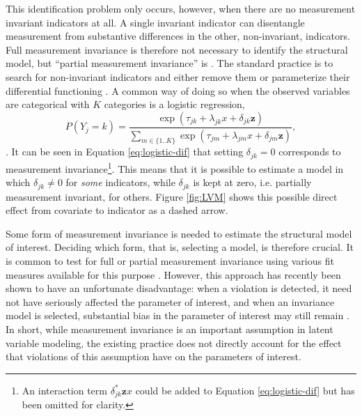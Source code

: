 \documentclass[letterpaper,12pt]{article}
\begin{document}
This identification problem only occurs, however, when there are no measurement invariant indicators at all. A single invariant indicator can disentangle measurement from substantive differences in the other, non-invariant, indicators. Full measurement invariance is therefore not necessary to identify the structural model, but ``partial measurement invariance'' is \citep{byrne1989testing}. The standard practice is to search for non-invariant indicators and either remove them or parameterize their differential functioning \citep{Holland:1993aa}. 
A common way of doing so when the observed variables are categorical with $K$ categories is a logistic regression, 
\begin{equation}
	P(Y_j = k) = \frac{\exp(\tau_{jk} + \lambda_{jk} x + \delta_{jk} \mathbf{z})}{\sum_{m \in \{1..K\}} \exp(\tau_{jm} + \lambda_{jm} x + \delta_{jm} \mathbf{z})},
	\label{eq:logistic-dif}
\end{equation}
\citep{mellenbergh1989item,kankaras2010testing}.
It can be seen in Equation \ref{eq:logistic-dif} that setting $\delta_{jk} = 0$ corresponds to measurement invariance\footnote{An interaction term $\delta_{jk}^* \mathbf{z}x$ could be added to Equation \ref{eq:logistic-dif} but has been omitted for clarity.}. This means that it is possible to estimate a model in which $\delta_{jk} \neq 0$ for \emph{some} indicators, while $\delta_{jk}$ is kept at zero, i.e. partially measurement invariant, for others. 
Figure \ref{fig:LVM} shows this possible direct effect from covariate to indicator as a dashed arrow. 


Some form of measurement invariance is needed to estimate the structural model of interest. Deciding which form, that is, selecting a model, is therefore crucial. It is common to test for full or partial measurement invariance using various fit measures available for this purpose \citep{byrne1989testing,hu1998fit,cheung2002evaluating,chen2007sensitivity,saris2009testing}. However, this approach has recently been shown to have an unfortunate disadvantage: when a violation is detected, it need not have seriously affected the parameter of interest, and when an invariance model is selected, substantial bias in the parameter of interest may still remain \citep{Oberski:WP:EPC-interest}. In short, while measurement invariance is an important assumption in latent variable modeling, the existing practice does not directly account for the effect that violations of this assumption have on the parameters of interest.
\end{document}
